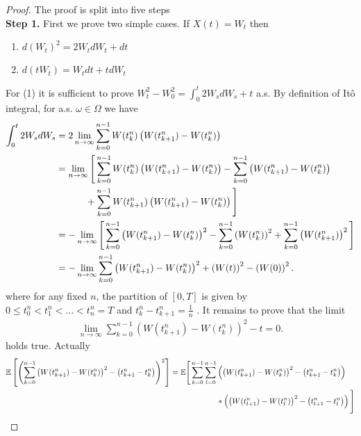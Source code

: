 \begin{proof}
  The proof is split into five steps \\[1ex]
  \textbf{Step 1.} First we prove two simple cases. If $X(t)=W_t$ then 
  \begin{enumerate}
    \item $d(W_t)^2 = 2W_t dW_t + dt $
    \item $d(tW_t) = W_t dt + t dW_t$
  \end{enumerate}
  For (1) it is sufficient to prove $W_t^2 - W_0^2 = \int_0^{t} 2W_s dW_s + t$ a.s. By definition of It\^o integral, for a.s. $\omega  \in \Omega $ we have 
  \begin{align*}
    \int_0^{t}2W_sdW_s &= 2 \lim_{n\to \infty} \sum_{k=0}^{n-1} W(t_k^{n} )\left(W(t_{k+1}^{n})-W(t_k^{n} )\right)\\
                       &= \lim_{n\to \infty} \Bigg[\sum_{k=0}^{n-1} W(t_k^{n})\left(W(t_{k+1}^{n}) - W(t_k^{n} )\right) - \sum_{k=0}^{n-1}\left(W(t_{k+1}^{n})-W(t_k^{n}) \right)  \\
                       & \hspace{1.1cm}+ \sum_{k=0}^{n-1}W(t_{k+1}^{n} )  \left(W(t_{k+1}^{n})-W(t_k^{n} ) \right) \Bigg]\\
                       &= - \lim_{n\to \infty} \Bigg[\sum_{k=0}^{n-1}\left( W(t_{k+1}^{n}) - W(t_k^{n} ) \right)^2 -  \sum_{k=0}^{n-1}\left(W(t_k^{n} )\right)^2 + \sum_{k=0}^{n-1}\left( W(t_{k+1}^n) \right)^2      \Bigg]\\
                       &= - \lim_{n\to \infty} \sum_{k=0}^{n-1}\left( W(t_{k+1}^{n}) - W(t_k^{n} ) \right)^2 +  \left(W(t)\right)^2 - \left( W(0) \right)^2 
  .\end{align*}
  where for any fixed $n$, the partition of $[0,T]$ is given by $0\le t_{0}^{n} < t_{1}^{n} < \ldots <t_n^{n} = T   $ and 
  $t_{k}^{n} - t_{k+1}^{n}   = \frac{1}{n}$ . It remains to prove that the limit 
  \begin{align*}
    \lim_{n\to \infty}\sum_{k=0}^{n-1} \left( W(t_{k+1}^{n} ) - W(t_k^{n} ) \right)^2 - t = 0 
  .\end{align*}
  holds true. Actually 
  \begin{align*}
    \E \left[ \left( \sum_{k=0}^{n-1}\left( W(t_{k+1}^{n} ) - W(t_k^{n})\right)^2 - \left( t_{k+1}^{n} - t_k^{n}   \right)   \right)^2   \right] =\E\Bigg[\sum_{k=0}^{n-1}\sum_{l=0}^{n-1} &\left( \left( W(t_{k+1}^{n} ) - W(t_k^{n})\right)^2 - \left( t_{k+1}^{n} - t_k^{n}   \right)   \right)\\
                                                                                                                                                                                                                                                                                                 &*\left( \left( W(t_{l+1}^{n} ) - W(t_l^{n})\right)^2 - \left( t_{l+1}^{n} - t_l^{n}   \right)   \right) \Bigg]

\end{align*}
\end{proof}
